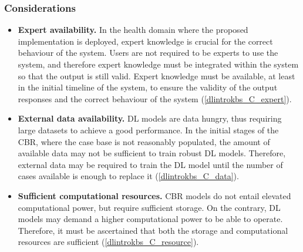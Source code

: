 \subsubsection*{Considerations}
\begin{itemize}
    \item \textbf{Expert availability.} In the health domain where the proposed implementation is deployed, expert knowledge is crucial for the correct behaviour of the system. Users are not required to be experts to use the system, and therefore expert knowledge must be integrated within the system so that the output is still valid. Expert knowledge must be available, at least in the initial timeline of the system, to ensure the validity of the output responses and the correct behaviour of the system (\ref{dlintrokbs_C_expert}).
    
    \item \textbf{External data availability.} DL models are data hungry, thus requiring large datasets to achieve a good performance. In the initial stages of the CBR, where the case base is not reasonably populated, the amount of available data may not be sufficient to train robust DL models. Therefore, external data may be required to train the DL model until the number of cases available is enough to replace it (\ref{dlintrokbs_C_data}).
    
    \item \textbf{Sufficient computational resources.} CBR models do not entail elevated computational power, but require sufficient storage. On the contrary, DL models may demand a higher computational power to be able to operate. Therefore, it must be ascertained that both the storage and computational resources are sufficient (\ref{dlintrokbs_C_resource}).
    
\end{itemize}
